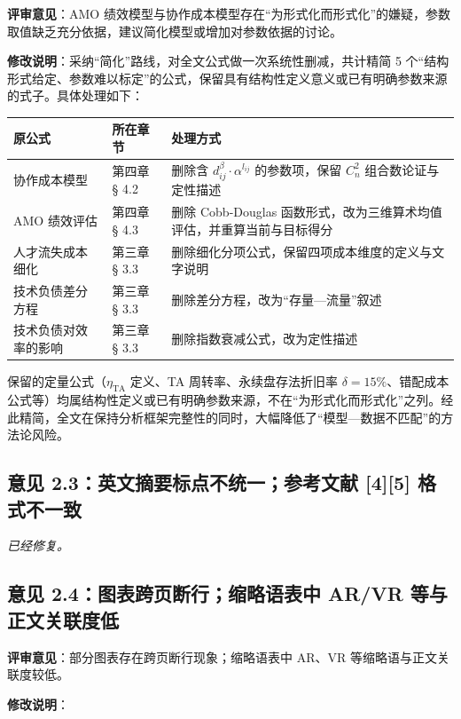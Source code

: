 \documentclass[11pt,a4paper]{ctexart}
\begin{document}
\noindent\textbf{评审意见}：AMO 绩效模型与协作成本模型存在“为形式化而形式化”的嫌疑，参数取值缺乏充分依据，建议简化模型或增加对参数依据的讨论。

\vspace{0.3em}
\noindent\textbf{修改说明}：采纳“简化”路线，对全文公式做一次系统性删减，共计精简 5 个“结构形式给定、参数难以标定”的公式，保留具有结构性定义意义或已有明确参数来源的式子。具体处理如下：

\begin{center}
\fontsize{9}{11}\selectfont
\begin{tabular}{lll}
\toprule
\textbf{原公式} & \textbf{所在章节} & \textbf{处理方式} \\
\midrule
协作成本模型 & 第四章 § 4.2 & 删除含 $d_{ij}^\beta \cdot \alpha^{l_{ij}}$ 的参数项，保留 $C_n^2$ 组合数论证与定性描述 \\
AMO 绩效评估 & 第四章 § 4.3 & 删除 Cobb-Douglas 函数形式，改为三维算术均值评估，并重算当前与目标得分 \\
人才流失成本细化 & 第三章 § 3.3 & 删除细化分项公式，保留四项成本维度的定义与文字说明 \\
技术负债差分方程 & 第三章 § 3.3 & 删除差分方程，改为“存量—流量”叙述 \\
技术负债对效率的影响 & 第三章 § 3.3 & 删除指数衰减公式，改为定性描述 \\
\bottomrule
\end{tabular}
\end{center}

保留的定量公式（$\eta_{\mathrm{TA}}$ 定义、TA 周转率、永续盘存法折旧率 $\delta=15\%$、错配成本公式等）均属结构性定义或已有明确参数来源，不在“为形式化而形式化”之列。经此精简，全文在保持分析框架完整性的同时，大幅降低了“模型—数据不匹配”的方法论风险。

\subsection{意见 2.3：英文摘要标点不统一；参考文献 [4][5] 格式不一致}

\noindent\emph{已经修复。}

\subsection{意见 2.4：图表跨页断行；缩略语表中 AR/VR 等与正文关联度低}

\noindent\textbf{评审意见}：部分图表存在跨页断行现象；缩略语表中 AR、VR 等缩略语与正文关联度较低。

\vspace{0.3em}
\noindent\textbf{修改说明}：
\end{document}

